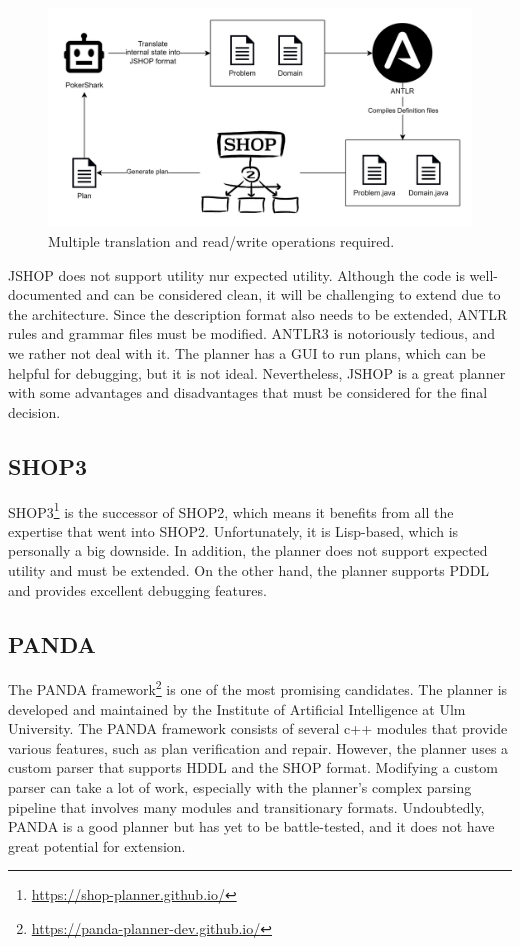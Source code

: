\begin{figure}[h]
    \centering
    \includegraphics[width=\textwidth]{graphics/jshop.png}
    \caption{Multiple translation and read/write operations required.}
    \label{fig:jshop}
\end{figure}



JSHOP does not support utility nur expected utility. Although the code is well-documented and can be considered clean, it will be challenging to extend due to the architecture. Since the description format also needs to be extended, ANTLR rules and grammar files must be modified. ANTLR3 is notoriously tedious, and we rather not deal with it. The planner has a GUI to run plans, which can be helpful for debugging, but it is not ideal. Nevertheless, JSHOP is a great planner with some advantages and disadvantages that must be considered for the final decision.





\subsection*{SHOP3}
SHOP3\footnote{\url{https://shop-planner.github.io/}} is the successor of SHOP2, which means it benefits from all the expertise that went into SHOP2. Unfortunately, it is Lisp-based, which is personally a big downside. In addition, the planner does not support expected utility and must be extended. On the other hand, the planner supports PDDL and provides excellent debugging features.



\subsection*{PANDA}

The PANDA framework\footnote{\url{https://panda-planner-dev.github.io/}} is one of the most promising candidates. The planner is developed and maintained by the Institute of Artificial Intelligence at Ulm University. The PANDA framework consists of several c++ modules that provide various features, such as plan verification and repair. However, the planner uses a custom parser that supports HDDL and the SHOP format. Modifying a custom parser can take a lot of work, especially with the planner's complex parsing pipeline that involves many modules and transitionary formats. Undoubtedly, PANDA is a good planner but has yet to be battle-tested, and it does not have great potential for extension.



